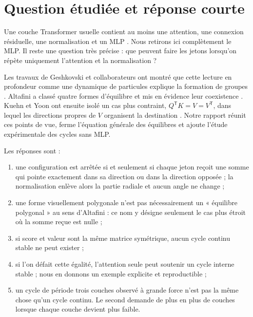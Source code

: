 \documentclass[11pt,a4paper]{article}
\theoremstyle{definition}
\newcommand{\T}{\mathsf T}
\begin{document}
\clearpage
\tableofcontents
\newpage

\section{Question étudiée et réponse courte}

Une couche Transformer usuelle contient au moins une attention, une connexion résiduelle,
une normalisation et un MLP \cite{vaswani2017attention}. Nous retirons ici complètement
le MLP. Il reste une question très précise : que peuvent faire les jetons lorsqu'on
répète uniquement l'attention et la normalisation ?

Les travaux de Geshkovski et collaborateurs ont montré que cette lecture en profondeur
comme une dynamique de particules explique la formation de groupes
\cite{geshkovski2023clusters,geshkovski2025perspective}. Altafini a classé quatre formes
d'équilibre et mis en évidence leur coexistence \cite{altafini2025multistability}.
Kuehn et Yoon ont ensuite isolé un cas plus contraint,
$Q^{\T}K=V=V^{\T}$, dans lequel les directions propres de $V$ organisent la destination
\cite{kuehnyoon2026spectral}. Notre rapport réunit ces points de vue, ferme l'équation
générale des équilibres et ajoute l'étude expérimentale des cycles sans MLP.

Les réponses sont :

\begin{enumerate}
  \item une configuration est arrêtée si et seulement si chaque jeton reçoit une somme
  qui pointe exactement dans sa direction ou dans la direction opposée ; la normalisation
  enlève alors la partie radiale et aucun angle ne change ;
  \item une forme visuellement polygonale n'est pas nécessairement un « équilibre
  polygonal » au sens d'Altafini : ce nom y désigne seulement le cas plus étroit où la
  somme reçue est nulle ;
  \item si score et valeur sont la même matrice symétrique, aucun cycle continu stable
  ne peut exister ;
  \item si l'on défait cette égalité, l'attention seule peut soutenir un cycle interne
  stable ; nous en donnons un exemple explicite et reproductible ;
  \item un cycle de période trois couches observé à grande force n'est pas la même chose
  qu'un cycle continu. Le second demande de plus en plus de couches lorsque chaque couche
  devient plus faible.
\end{enumerate}
\end{document}
